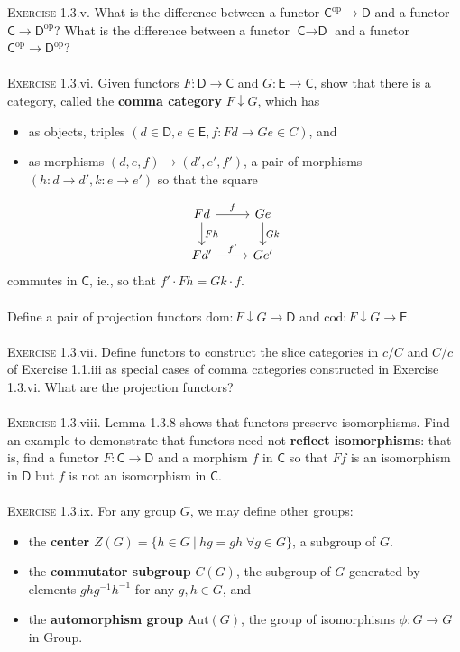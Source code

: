 \documentclass{article}
\newcommand{\cat}[1]{\textsf{#1}}
\begin{document}
\textsc{Exercise} 1.3.v. What is the difference between a functor $\textsf{C}^{\text{op}} \to \textsf{D}$ and a functor $\textsf{C} \to \textsf{D}^{\text{op}}$? What is the difference between a functor $\textsf{C} \to \textsf{D}$ and a functor $\textsf{C}^{\text{op}} \to \textsf{D}^{\text{op}}$? \\ \\
\textsc{Exercise} 1.3.vi. Given functors $F: \textsf{D} \to \textsf{C}$ and $G: \textsf{E} \to \textsf{C}$, show that there is a category, called the \textbf{comma category} $F \downarrow G$, which has 
\begin{itemize}
    \item as objects, triples $(d \in \textsf{D}, e\in \textsf{E}, f: Fd \to Ge \in C)$, and 
    \item as morphisms $(d, e, f) \to (d', e', f')$, a pair of morphisms $(h: d \to d', k: e \to e')$ so that the square
\end{itemize}
    \begin{equation}
        \begin{tikzcd} 
            Fd \arrow[d, "Fh"]\arrow[r, "f"] & Ge \arrow[d, "Gk"] \\
            Fd' \arrow[r, "f'"] &Ge'
        \end{tikzcd}
    \end{equation}
    \indent commutes in $\textsf{C}$, ie., so that $f' \cdot Fh = Gk \cdot f$. \\  \\
Define a pair of projection functors $\text{dom}: F \downarrow G \to \textsf{D}$ and $\text{cod}: F \downarrow G \to \textsf{E}$. \\ \\
\textsc{Exercise} 1.3.vii. Define functors to construct the slice categories in $c/C$ and $C/c$ of Exercise 1.1.iii as special cases of comma categories constructed in Exercise 1.3.vi. What are the projection functors? \\ \\
\textsc{Exercise} 1.3.viii. Lemma 1.3.8 shows that functors preserve isomorphisms. Find an example to demonstrate that functors need not \textbf{reflect isomorphisms}: that is, find a functor $F: \textsf{C} \to \textsf{D}$ and a morphism $f$ in $\textsf{C}$ so that $Ff$ is an isomorphism in $\textsf{D}$ but $f$ is not an isomorphism in $\textsf{C}$. \\ \\
\textsc{Exercise} 1.3.ix. For any group $G$, we may define other groups:
\begin{itemize}
    \item the \textbf{center} $Z(G) = \{ h \in G \: | \: hg=gh \; \forall g \in G \}$, a subgroup of $G$. 
    \item the \textbf{commutator subgroup} $C(G)$, the subgroup of $G$ generated by elements $ghg^{-1}h^{-1}$ for any $g,h \in G$, and
    \item the \textbf{automorphism group} $\text{Aut}(G)$, the group of isomorphisms $\phi: G \to G$ in \cat{Group}.
\end{itemize}
\end{document}
